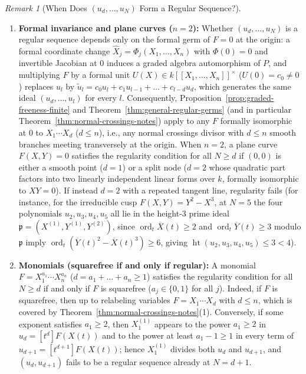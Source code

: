 \documentclass[a4paper, 12pt]{amsart}
\theoremstyle{remark}
\newtheorem{remark}[theorem]{Remark}
\begin{document}
\begin{remark}[When Does $(u_d, \dots, u_N)$ Form a Regular Sequence?]
\begin{enumerate}
  \item \textbf{Formal invariance and plane curves ($n = 2$):}
  Whether $(u_d, \dots, u_N)$ is a regular sequence depends only on the formal germ of $F = 0$ at the origin:
  a formal coordinate change $\hat{X}_j = \Phi_j(X_1, \dots, X_n)$ with $\Phi(0) = 0$ and invertible Jacobian at $0$ induces a graded algebra automorphism of $P$,
  and multiplying $F$ by a formal unit $U(X) \in k[[X_1, \dots, X_n]]^\times$ ($U(0) = c_0 \ne 0$) replaces $u_l$ by $\tilde{u}_l = c_0 u_l + c_1 u_{l - 1} + \dots + c_{l - d} u_d$,
  which generates the same ideal $(u_d, \dots, u_l)$ for every $l$.
  Consequently,
  Proposition~\ref{prop:graded-freeness-finite} and Theorem~\ref{thm:general-regular-germs} (and in particular Theorem~\ref{thm:normal-crossings-notes}) apply to any $F$ formally isomorphic at $0$ to $X_1 \cdots X_d$ ($d \le n$),
  i.e., any normal crossings divisor with $d \le n$ smooth branches meeting transversely at the origin.
  When $n = 2$,
  a plane curve $F(X, Y) = 0$ satisfies the regularity condition for all $N \ge d$ if $(0, 0)$ is either a smooth point ($d = 1$) or a split node ($d = 2$ whose quadratic part factors into two linearly independent linear forms over $k$, formally isomorphic to $X Y = 0$).
  If instead $d = 2$ with a repeated tangent line,
  regularity fails
  (for instance, for the irreducible cusp $F(X, Y) = Y^2 - X^3$, at $N = 5$ the four polynomials $u_2, u_3, u_4, u_5$ all lie in the height-$3$ prime ideal $\mathfrak{p} = (X^{(1)}, Y^{(1)}, Y^{(2)})$, since $\operatorname{ord}_t \overline{X}(t) \ge 2$ and $\operatorname{ord}_t \overline{Y}(t) \ge 3$ modulo $\mathfrak{p}$ imply $\operatorname{ord}_t(\overline{Y}(t)^2 - \overline{X}(t)^3) \ge 6$, giving $\operatorname{ht}(u_2, u_3, u_4, u_5) \le 3 < 4$).

  \item \textbf{Monomials (squarefree if and only if regular):}
  A monomial $F = X_1^{a_1} \cdots X_n^{a_n}$ ($d = a_1 + \dots + a_n \ge 1$) satisfies the regularity condition for all $N \ge d$ if and only if $F$ is squarefree ($a_j \in \{0, 1\}$ for all $j$).
  Indeed,
  if $F$ is squarefree,
  then up to relabeling variables $F = X_1 \cdots X_d$ with $d \le n$,
  which is covered by Theorem~\ref{thm:normal-crossings-notes}(1).
  Conversely,
  if some exponent satisfies $a_1 \ge 2$,
  then $X_1^{(1)}$ appears to the power $a_1 \ge 2$ in $u_d = [t^d]F(X(t))$ and to the power at least $a_1 - 1 \ge 1$ in every term of $u_{d + 1} = [t^{d + 1}]F(X(t))$;
  hence $X_1^{(1)}$ divides both $u_d$ and $u_{d + 1}$,
  and $(u_d, u_{d + 1})$ fails to be a regular sequence already at $N = d + 1$.
\end{enumerate}


\end{remark}
\end{document}
